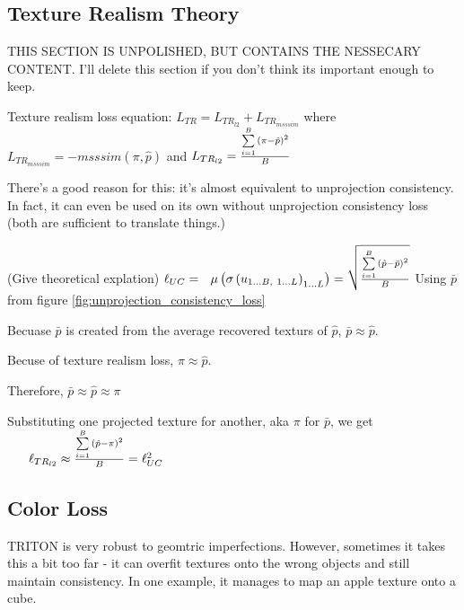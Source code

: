 \documentclass{article}
\begin{document}
	\subsection*{Texture Realism Theory}
		\label{sec:texture_realism_theory}


		THIS SECTION IS UNPOLISHED, BUT CONTAINS  THE NESSECARY CONTENT.
		I'll delete this section if you don't think its important enough to keep.

		Texture realism loss equation:
		$L_{TR}=L_{TR_{l2}}+L_{TR_{msssim}}$
		where 
		$L_{TR_{msssim}} = -msssim(\pi,\hat{p})$ and
		$L_{TR_{l2}} = \frac{
			\sum\limits_{i=1}^B {
			\left( \pi-\hat{p}  \right)^2
				} 
		}
		{B}$

		There's a good reason for this: it's almost equivalent to unprojection consistency.
		In fact, it can even be used on its own without unprojection consistency loss (both are sufficient to translate things.)

		(Give theoretical explation)
		$
		\ell_{UC} = 
		\
		\
		\mu\left(\sigma\left(u_{1\dots B,\ 1\dots L}\right)_{1 \dots L}\right) = 
		\sqrt{
		\frac{
			\sum\limits_{i=1}^B {
				\left( \hat{p}-\bar{p}  \right)^2
				} 
			}
			{B}
		}
		$
		Using $\bar{p}$ from figure \ref{fig:unprojection_consistency_loss}

		Becuase $\bar{p}$ is created from the average recovered texturs of $\hat{p}$, $\bar{p} \approx \hat{p}$.

		Becuse of texture realism loss, $\pi \approx \hat{p}$.

		Therefore, $\bar{p} \approx \hat{p} \approx \pi$



		Substituting one projected texture for another, aka $\pi$ for $\bar{p}$, we get 
		$ \
		\
		\
		\
		\ \ell_{TR_{l2}}
		\approx
		\frac{\sum\limits_{i=1}^B {
			\left( \hat{p}-\pi  \right)^2
			}}{B} = \ell_{UC}^2
		$


		\subsection{Color Loss}

		TRITON is very robust to geomtric imperfections. However, sometimes it takes this a bit too far - it can overfit textures onto the wrong objects and still maintain consistency.
		In one example, it manages to map an apple texture onto a cube. 
\end{document}
